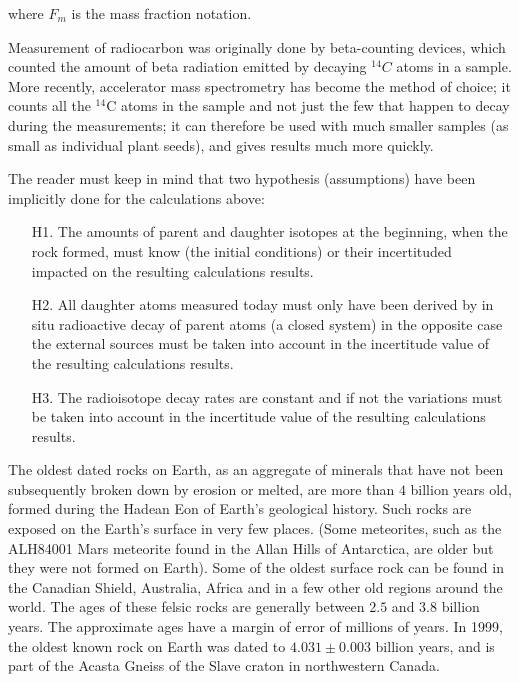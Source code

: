 	where $F_m$ is the mass fraction notation.
	
	\begin{tcolorbox}[title=Remark,colframe=black,arc=10pt]
	Measurement of radiocarbon was originally done by beta-counting devices, which counted the amount of beta radiation emitted by decaying $^14C$ atoms in a sample. More recently, accelerator mass spectrometry has become the method of choice; it counts all the $^{14}\mathrm{C}$ atoms in the sample and not just the few that happen to decay during the measurements; it can therefore be used with much smaller samples (as small as individual plant seeds), and gives results much more quickly.
	\end{tcolorbox}
	The reader must keep in mind that two hypothesis (assumptions) have been implicitly done for the calculations above:
	\begin{enumerate}
		\item[H1.] The amounts of parent and daughter isotopes at the beginning, when the rock formed, must know (the initial conditions) or their incertituded impacted on the resulting calculations results.

		\item[H2.] All daughter atoms measured today must only have been derived by in situ radioactive decay of parent atoms (a closed system) in the opposite case the external sources must be taken into account in the incertitude value of the resulting calculations results.
		
		\item[H3.] The radioisotope decay rates are constant and if not the variations must be taken into account in the incertitude value of the resulting calculations results.
	\end{enumerate}
	\begin{tcolorbox}[title=Remark,colframe=black,arc=10pt]
	The oldest dated rocks on Earth, as an aggregate of minerals that have not been subsequently broken down by erosion or melted, are more than $4$ billion years old, formed during the Hadean Eon of Earth's geological history. Such rocks are exposed on the Earth's surface in very few places. (Some meteorites, such as the ALH84001 Mars meteorite found in the Allan Hills of Antarctica, are older but they were not formed on Earth). Some of the oldest surface rock can be found in the Canadian Shield, Australia, Africa and in a few other old regions around the world. The ages of these felsic rocks are generally between $2.5$ and $3.8$ billion years. The approximate ages have a margin of error of millions of years. In 1999, the oldest known rock on Earth was dated to $4.031 \pm 0.003$ billion years, and is part of the Acasta Gneiss of the Slave craton in northwestern Canada.
	\end{tcolorbox}	
	
